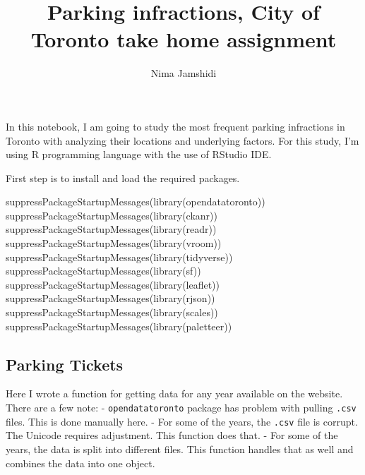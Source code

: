 \documentclass[
]{article}
\title{Parking infractions, City of Toronto take home assignment}
\author{Nima Jamshidi}
\date{}
\newenvironment{Shaded}{\begin{snugshade}}{\end{snugshade}}
\newcommand{\FunctionTok}[1]{\textcolor[rgb]{0.00,0.00,0.00}{#1}}
\newcommand{\NormalTok}[1]{#1}
\begin{document}
\maketitle

{
\setcounter{tocdepth}{2}
\tableofcontents
}
In this notebook, I am going to study the most frequent parking
infractions in Toronto with analyzing their locations and underlying
factors. For this study, I'm using R programming language with the use
of RStudio IDE.

First step is to install and load the required packages.

\begin{Shaded}
\begin{Highlighting}[]
\FunctionTok{suppressPackageStartupMessages}\NormalTok{(}\FunctionTok{library}\NormalTok{(opendatatoronto))}
\FunctionTok{suppressPackageStartupMessages}\NormalTok{(}\FunctionTok{library}\NormalTok{(ckanr))}
\FunctionTok{suppressPackageStartupMessages}\NormalTok{(}\FunctionTok{library}\NormalTok{(readr))}
\FunctionTok{suppressPackageStartupMessages}\NormalTok{(}\FunctionTok{library}\NormalTok{(vroom))}
\FunctionTok{suppressPackageStartupMessages}\NormalTok{(}\FunctionTok{library}\NormalTok{(tidyverse))}
\FunctionTok{suppressPackageStartupMessages}\NormalTok{(}\FunctionTok{library}\NormalTok{(sf))}
\FunctionTok{suppressPackageStartupMessages}\NormalTok{(}\FunctionTok{library}\NormalTok{(leaflet))}
\FunctionTok{suppressPackageStartupMessages}\NormalTok{(}\FunctionTok{library}\NormalTok{(rjson))}
\FunctionTok{suppressPackageStartupMessages}\NormalTok{(}\FunctionTok{library}\NormalTok{(scales))}
\FunctionTok{suppressPackageStartupMessages}\NormalTok{(}\FunctionTok{library}\NormalTok{(paletteer))}
\end{Highlighting}
\end{Shaded}

\hypertarget{parking-tickets}{%
\subsection{Parking Tickets}\label{parking-tickets}}

Here I wrote a function for getting data for any year available on the
website. There are a few note: - \texttt{opendatatoronto} package has
problem with pulling \texttt{.csv} files. This is done manually here. -
For some of the years, the \texttt{.csv} file is corrupt. The Unicode
requires adjustment. This function does that. - For some of the years,
the data is split into different files. This function handles that as
well and combines the data into one object.
\end{document}
